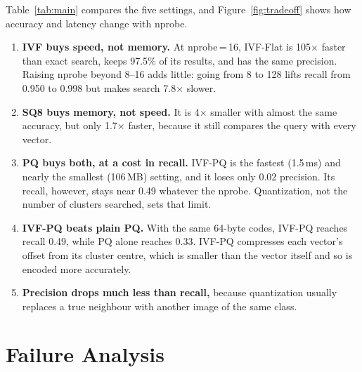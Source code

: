 \documentclass[sigconf,nonacm,pbalance]{acmart}
\begin{document}
Table~\ref{tab:main} compares the five settings, and Figure~\ref{fig:tradeoff} shows how accuracy and latency change with nprobe.
\begin{enumerate}[nosep,leftmargin=*]
  \item \textbf{IVF buys speed, not memory.} At nprobe\,=\,16, IVF-Flat is 105$\times$ faster than exact search, keeps 97.5\% of its results, and has the same
  precision. Raising nprobe beyond 8--16 adds little: going from 8 to 128 lifts recall from 0.950 to 0.998 but makes search 7.8$\times$ slower.
  \item \textbf{SQ8 buys memory, not speed.} It is 4$\times$ smaller with almost the same accuracy, but only 1.7$\times$ faster, because it still compares the query with every vector.
  \item \textbf{PQ buys both, at a cost in recall.} IVF-PQ is the fastest (1.5\,ms) and nearly the smallest (106\,MB) setting, and it loses only
  0.02 precision. Its recall, however, stays near 0.49 whatever the nprobe. Quantization, not the number of clusters searched, sets that limit.
  \item \textbf{IVF-PQ beats plain PQ.} With the same 64-byte codes, IVF-PQ reaches recall 0.49, while PQ alone reaches 0.33. IVF-PQ compresses each
  vector's offset from its cluster centre, which is smaller than the vector itself and so is encoded more accurately.
  \item \textbf{Precision drops much less than recall,} because quantization usually replaces a true neighbour with another image of the same class.
\end{enumerate}

\section{Failure Analysis}
\end{document}
